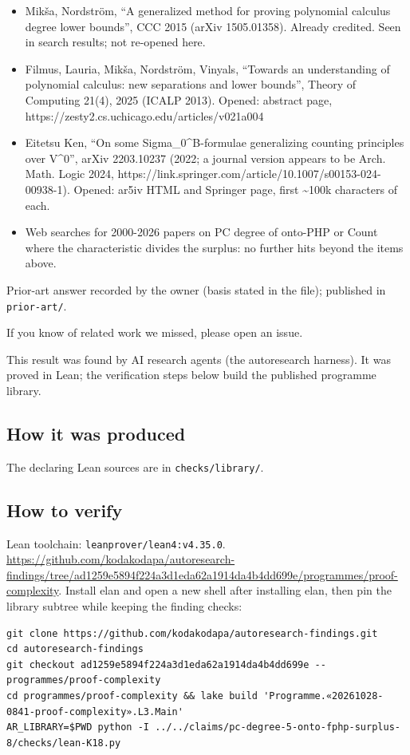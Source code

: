 \documentclass{article}
\begin{document}
\begin{itemize}
\item Mikša, Nordström, ``A generalized method for proving polynomial calculus degree lower bounds'', CCC 2015 (arXiv 1505.01358). Already credited. Seen in search results; not re-opened here.
\item Filmus, Lauria, Mikša, Nordström, Vinyals, ``Towards an understanding of polynomial calculus: new separations and lower bounds'', Theory of Computing 21(4), 2025 (ICALP 2013). Opened: abstract page, https://zesty2.cs.uchicago.edu/articles/v021a004
\item Eitetsu Ken, ``On some Sigma\_0\textasciicircum{}B-formulae generalizing counting principles over V\textasciicircum{}0'', arXiv 2203.10237 (2022; a journal version appears to be Arch. Math. Logic 2024, https://link.springer.com/article/10.1007/s00153-024-00938-1). Opened: ar5iv HTML and Springer page, first \textasciitilde{}100k characters of each.
\item Web searches for 2000-2026 papers on PC degree of onto-PHP or Count where the characteristic divides the surplus: no further hits beyond the items above.
\end{itemize}

Prior-art answer recorded by the owner (basis stated in the file); published in \texttt{prior-art/}.

If you know of related work we missed, please open an issue.

This result was found by AI research agents (the autoresearch harness). It was proved in Lean; the verification steps below build the published programme library.

\subsection*{How it was produced}

The declaring Lean sources are in \texttt{checks/library/}.

\subsection*{How to verify}

Lean toolchain: \texttt{leanprover/lean4:v4.35.0}. \url{https://github.com/kodakodapa/autoresearch-findings/tree/ad1259e5894f224a3d1eda62a1914da4b4dd699e/programmes/proof-complexity}. Install elan and open a new shell after installing elan, then pin the library subtree while keeping the finding checks:

\begin{verbatim}
git clone https://github.com/kodakodapa/autoresearch-findings.git
cd autoresearch-findings
git checkout ad1259e5894f224a3d1eda62a1914da4b4dd699e -- programmes/proof-complexity
cd programmes/proof-complexity && lake build 'Programme.«20261028-0841-proof-complexity».L3.Main'
AR_LIBRARY=$PWD python -I ../../claims/pc-degree-5-onto-fphp-surplus-8/checks/lean-K18.py
\end{verbatim}
\end{document}
